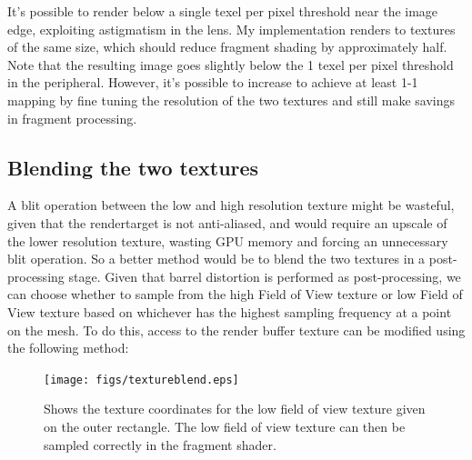 \documentclass[12pt,a4paper,twoside,openright]{report}
\begin{document}
It's possible to render below a single texel per pixel threshold near the image edge, exploiting astigmatism in the lens. My implementation renders to textures of the same size, which should reduce fragment shading by approximately half. Note that the resulting image goes slightly below the 1 texel per pixel threshold in the peripheral. However, it's possible to increase to achieve at least 1-1 mapping by fine tuning the resolution of the two textures and still make savings in fragment processing.

\subsection{Blending the two textures}\label{blending}

A blit operation between the low and high resolution texture might be wasteful, given that the rendertarget is not anti-aliased, and would require an upscale of the lower resolution texture, wasting GPU memory and forcing an unnecessary blit operation. So a better method would be to blend the two textures in a post-processing stage. Given that barrel distortion is performed as post-processing, we can choose whether to sample from the high Field of View texture or low Field of View texture based on whichever has the highest sampling frequency at a point on the mesh. To do this, access to the render buffer texture can be modified using the following method:

\begin{figure}[tbh]
\centerline{\texttt{[image: figs/textureblend.eps]}}
\caption{Shows the texture coordinates for the low field of view texture given on the outer rectangle. The low field of view texture can then be sampled correctly in the fragment shader.}
\label{fig:texblend}
\end{figure}
\end{document}
